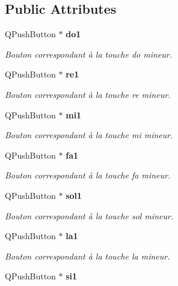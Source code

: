 \subsection*{Public Attributes}
\begin{DoxyCompactItemize}
\item 
Q\-Push\-Button $\ast$ {\bf do1}\label{class_clavier_piano_aadb5136daa81a6687ac7e0ced227d325}

\begin{DoxyCompactList}\small\item\em Bouton correspondant à la touche do mineur. \end{DoxyCompactList}\item 
Q\-Push\-Button $\ast$ {\bf re1}\label{class_clavier_piano_aebdccde190d79e591fdc9dbfb51758fd}

\begin{DoxyCompactList}\small\item\em Bouton correspondant à la touche re mineur. \end{DoxyCompactList}\item 
Q\-Push\-Button $\ast$ {\bf mi1}\label{class_clavier_piano_aa6fee0b94c86525216442a14b0c836e5}

\begin{DoxyCompactList}\small\item\em Bouton correspondant à la touche mi mineur. \end{DoxyCompactList}\item 
Q\-Push\-Button $\ast$ {\bf fa1}\label{class_clavier_piano_af95f08af4576f6e09d4a5d95359273d6}

\begin{DoxyCompactList}\small\item\em Bouton correspondant à la touche fa mineur. \end{DoxyCompactList}\item 
Q\-Push\-Button $\ast$ {\bf sol1}\label{class_clavier_piano_a36455016346d1b256b3758f9daa9d44e}

\begin{DoxyCompactList}\small\item\em Bouton correspondant à la touche sol mineur. \end{DoxyCompactList}\item 
Q\-Push\-Button $\ast$ {\bf la1}\label{class_clavier_piano_a373479513390a61eda79f6b9eea8a636}

\begin{DoxyCompactList}\small\item\em Bouton correspondant à la touche la mineur. \end{DoxyCompactList}\item 
Q\-Push\-Button $\ast$ {\bf si1}\label{class_clavier_piano_ab623aa890744b86490495589ae0cc753}


\end{DoxyCompactItemize}
